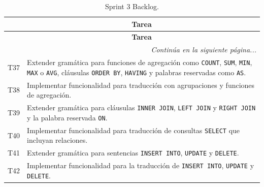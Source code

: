\begin{longtable}[c]{|c|m{}|}
    \caption{Sprint 3 Backlog.}
    \label{tab:sprintBacklog3} \\
    
    \hline
    \rowcolor{gray!50}
    \multicolumn{1}{|c|}{\textbf{Código}} & \multicolumn{1}{c|}{\textbf{Tarea}} \\
    \hline
    \endfirsthead

    \hline
    \rowcolor{gray!50}
    \multicolumn{1}{|c|}{\textbf{Código}} & \multicolumn{1}{c|}{\textbf{Tarea}} \\
    \hline
    \endhead

    \multicolumn{2}{r}{\textit{Continúa en la siguiente página...}} \\
    \endfoot
    
    \endlastfoot

    T37 & Extender gramática para funciones de agregación como \texttt{COUNT}, \texttt{SUM}, \texttt{MIN}, \texttt{MAX} o \texttt{AVG}, cláusulas \texttt{ORDER BY}, \texttt{HAVING} y palabras reservadas como \texttt{AS}. \\
    \hline
    T38 & Implementar funcionalidad para traducción con agrupaciones y funciones de agregación. \\
    \hline
    T39 & Extender gramática para cláusulas \texttt{INNER JOIN}, \texttt{LEFT JOIN} y \texttt{RIGHT JOIN} y la palabra reservada \texttt{ON}. \\
    \hline
    T40 & Implementar funcionalidad para traducción de consultas \texttt{SELECT} que incluyan relaciones. \\
    \hline
    T41 & Extender gramática para sentencias \texttt{INSERT INTO}, \texttt{UPDATE} y \texttt{DELETE}. \\
    \hline
    T42 & Implementar funcionalidad para la traducción de \texttt{INSERT INTO}, \texttt{UPDATE} y \texttt{DELETE}. \\
    \hline
\end{longtable}